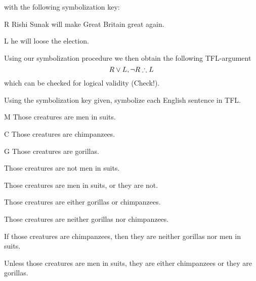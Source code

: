 with the following symbolization key:
\begin{ekey}
		\item[R] Rishi Sunak will make Great Britain great again.
		\item[L] he will loose the election.
\end{ekey}

Using our symbolization procedure we then obtain the following TFL-argument $$R\eor L,\enot R\therefore L$$ which can be checked for logical validity (Check!).


\begin{practiceproblems}
\problempart Using the symbolization key given, symbolize each English sentence in TFL.\label{pr.monkeysuits}
	\begin{ekey}
		\item[M] Those creatures are men in suits.
		\item[C] Those creatures are chimpanzees.
		\item[G] Those creatures are gorillas.
	\end{ekey}
\begin{earg}
\item Those creatures are not men in suits.
\item Those creatures are men in suits, or they are not.
\item Those creatures are either gorillas or chimpanzees.
\item Those creatures are neither gorillas nor chimpanzees.
\item If those creatures are chimpanzees, then they are neither gorillas nor men in suits.
\item Unless those creatures are men in suits, they are either chimpanzees or they are gorillas.
\end{earg}


\end{practiceproblems}
